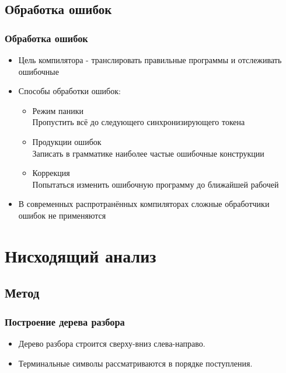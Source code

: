 \documentclass[16pt,pdf,unicode]{beamer}
\begin{document}
\subsection{Обработка ошибок}
\begin{frame}
\frametitle{Обработка ошибок}
\begin{itemize}
  \item Цель компилятора - транслировать правильные программы и отслеживать ошибочные
  \item Способы обработки ошибок:
  \begin{itemize}
    \item Режим паники \\ Пропустить всё до следующего синхронизирующего токена
    \item Продукции ошибок \\ Записать в грамматике наиболее частые ошибочные конструкции
    \item Коррекция \\ Попытаться изменить ошибочную программу до ближайшей рабочей
  \end{itemize}
  \item В современных распротранённых компиляторах сложные обработчики ошибок не применяются
\end{itemize}
\end{frame}

\section{Нисходящий анализ}

\begin{frame}[plain]
  \begin{center}
  \end{center}
\end{frame}

\addtocounter{framenumber}{-1}

\subsection{Метод}
\begin{frame}
\frametitle{Построение дерева разбора}
\begin{itemize}
  \item Дерево разбора строится сверху-вниз слева-направо.
  \item Терминальные символы рассматриваются в порядке поступления.
\end{itemize}
\end{frame}
\end{document}
